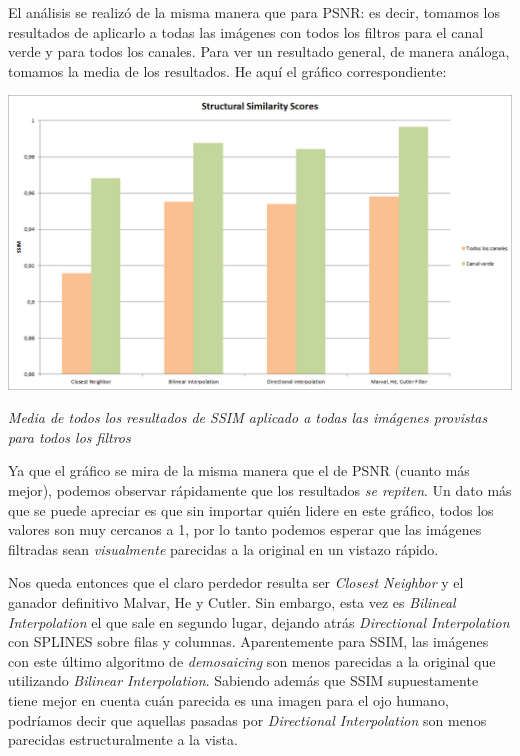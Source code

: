 \begin{itemize}
El análisis se realizó de la misma manera que para PSNR: es decir, tomamos los resultados de aplicarlo a todas las imágenes con todos los filtros para el canal verde y para todos los canales. Para ver un resultado general, de manera análoga, tomamos la media de los resultados. He aquí el gráfico correspondiente:

	\begin{center}
		\includegraphics[scale=0.3]{./img/ssimScores.png}
		\vspace{2pt}
		\par
		\footnotesize\textit{Media de todos los resultados de SSIM aplicado a todas las imágenes provistas para todos los filtros}
	\end{center}
	
Ya que el gráfico se mira de la misma manera que el de PSNR (cuanto más mejor), podemos observar rápidamente que los resultados \textit{se repiten}. Un dato más que se puede apreciar es que sin importar quién lidere en este gráfico, todos los valores son muy cercanos a 1, por lo tanto podemos esperar que las imágenes filtradas sean \textit{visualmente} parecidas a la original en un vistazo rápido. 

Nos queda entonces que el claro perdedor resulta ser \textit{Closest Neighbor} y el ganador definitivo Malvar, He y Cutler. Sin embargo, esta vez es \textit{Bilineal Interpolation} el que sale en segundo lugar, dejando atrás \textit{Directional Interpolation} con SPLINES sobre filas y columnas. Aparentemente para SSIM, las imágenes con este último algoritmo de \textit{demosaicing} son menos parecidas a la original que utilizando \textit{Bilinear Interpolation}. Sabiendo además que SSIM supuestamente tiene mejor en cuenta cuán parecida es una imagen para el ojo humano, podríamos decir que aquellas pasadas por \textit{Directional Interpolation} son menos parecidas estructuralmente a la vista.



\end{itemize}
